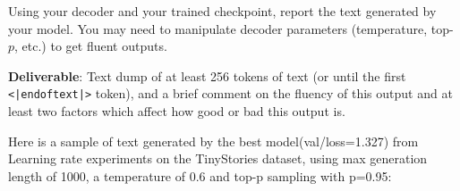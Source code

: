 
Using your decoder and your trained checkpoint, report the text generated by your model. You may need to manipulate decoder parameters (temperature, top-$p$, etc.) to get fluent outputs.

\textbf{Deliverable}: Text dump of at least 256 tokens of text (or until the first \lstinline{<|endoftext|>} token), and a brief comment on the fluency of this output and at least two factors which affect how good or bad this output is.

\begin{answer}

Here is a sample of text generated by the best model(val/loss=1.327) from Learning rate experiments on the TinyStories dataset, using max generation length of 1000, a temperature of 0.6 and top-p sampling with p=0.95:


\end{answer}
